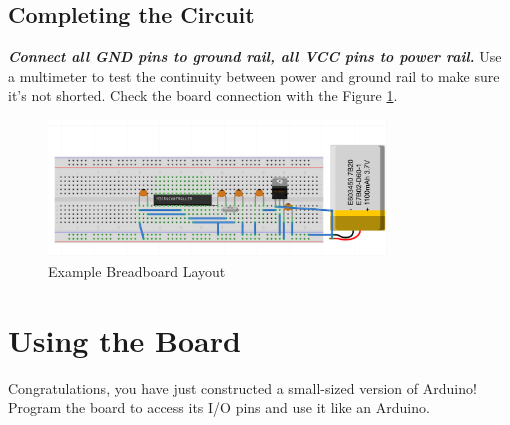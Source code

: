 \documentclass{article}
\begin{document}
\subsection{Completing the Circuit}
\textbf{\emph{Connect all GND pins to ground rail, all VCC pins to power rail.}} Use a multimeter to test the continuity between power and ground rail to make sure it's not shorted. Check the board connection with the Figure \ref{img:egBBL}.

\begin{figure}[!h]
    \center
    \includegraphics[width=0.8\textwidth,keepaspectratio]{egBBL}
    \caption{Example Breadboard Layout}
    \label{img:egBBL}
\end{figure}

\section{Using the Board}
Congratulations, you have just constructed a small-sized version of Arduino! Program the board to access its I/O pins and use it like an Arduino.
\end{document}
